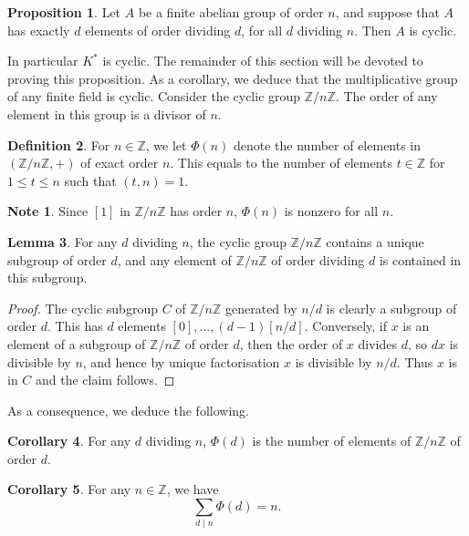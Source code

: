 \documentclass{article}
\newcommand{\Z}{\mathbb{Z}}
\newcommand{\rb}[1]{\left( #1 \right)}
\renewcommand{\sb}[1]{\left[ #1 \right]}
\theoremstyle{definition}\newtheorem{definition}{Definition}[subsection]
\theoremstyle{definition}\newtheorem{remark}[definition]{Remark}
\theoremstyle{definition}\newtheorem*{example}{Example}
\theoremstyle{definition}\newtheorem*{note}{Note}
\newtheorem{proposition}[definition]{Proposition}
\newtheorem{lemma}[definition]{Lemma}
\newtheorem{corollary}[definition]{Corollary}
\begin{document}
\begin{proposition}
\label{prop:6.4.1}
Let $ A $ be a finite abelian group of order $ n $, and suppose that $ A $ has exactly $ d $ elements of order dividing $ d $, for all $ d $ dividing $ n $. Then $ A $ is cyclic.
\end{proposition}

In particular $ K^* $ is cyclic. The remainder of this section will be devoted to proving this proposition. As a corollary, we deduce that the multiplicative group of any finite field is cyclic. Consider the cyclic group $ \Z / n\Z $. The order of any element in this group is a divisor of $ n $.

\begin{definition}
For $ n \in \Z $, we let $ \Phi\rb{n} $ denote the number of elements in $ \rb{\Z / n\Z, +} $ of exact order $ n $. This equals to the number of elements $ t \in \Z $ for $ 1 \le t \le n $ such that $ \rb{t, n} = 1 $.
\end{definition}

\begin{note}
Since $ \sb{1} $ in $ \Z / n\Z $ has order $ n $, $ \Phi\rb{n} $ is nonzero for all $ n $.
\end{note}

\begin{lemma}
For any $ d $ dividing $ n $, the cyclic group $ \Z / n\Z $ contains a unique subgroup of order $ d $, and any element of $ \Z / n\Z $ of order dividing $ d $ is contained in this subgroup.
\end{lemma}

\begin{proof}
The cyclic subgroup $ C $ of $ \Z / n\Z $ generated by $ n / d $ is clearly a subgroup of order $ d $. This has $ d $ elements $ \sb{0}, \dots, \rb{d - 1}\sb{n / d} $. Conversely, if $ x $ is an element of a subgroup of $ \Z / n\Z $ of order $ d $, then the order of $ x $ divides $ d $, so $ dx $ is divisible by $ n $, and hence by unique factorisation $ x $ is divisible by $ n / d $. Thus $ x $ is in $ C $ and the claim follows.
\end{proof}

As a consequence, we deduce the following.

\begin{corollary}
For any $ d $ dividing $ n $, $ \Phi\rb{d} $ is the number of elements of $ \Z / n\Z $ of order $ d $.
\end{corollary}

\begin{corollary}
For any $ n \in \Z $, we have
$$ \sum_{d \mid n} \Phi\rb{d} = n. $$
\end{corollary}
\end{document}
